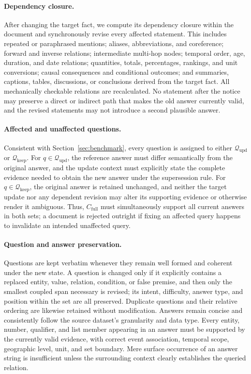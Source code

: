 \paragraph{Dependency closure.}
After changing the target fact, we compute its dependency closure within the document and synchronously revise every affected statement. This includes repeated or paraphrased mentions; aliases, abbreviations, and coreference; forward and inverse relations; intermediate multi-hop nodes; temporal order, age, duration, and date relations; quantities, totals, percentages, rankings, and unit conversions; causal consequences and conditional outcomes; and summaries, captions, tables, discussions, or conclusions derived from the target fact. All mechanically checkable relations are recalculated. No statement after the notice may preserve a direct or indirect path that makes the old answer currently valid, and the revised statements may not introduce a second plausible answer.

\paragraph{Affected and unaffected questions.}
Consistent with Section~\ref{sec:benchmark}, every question is assigned to either $\mathcal{Q}_{\mathrm{upd}}$ or $\mathcal{Q}_{\mathrm{keep}}$. For $q\in\mathcal{Q}_{\mathrm{upd}}$, the reference answer must differ semantically from the original answer, and the update context must explicitly state the complete evidence needed to obtain the new answer under the supersession rule. For $q\in\mathcal{Q}_{\mathrm{keep}}$, the original answer is retained unchanged, and neither the target update nor any dependent revision may alter its supporting evidence or otherwise render it ambiguous. Thus, $C_{\mathrm{full}}$ must simultaneously support all current answers in both sets; a document is rejected outright if fixing an affected query happens to invalidate an intended unaffected query.

\paragraph{Question and answer preservation.}
Questions are kept verbatim whenever they remain well formed and coherent under the new state. A question is changed only if it explicitly contains a replaced entity, value, relation, condition, or false premise, and then only the smallest coupled span necessary is revised; its intent, difficulty, answer type, and position within the set are all preserved. Duplicate questions and their relative ordering are likewise retained without modification. Answers remain concise and consistently follow the source dataset's granularity and data type. Every entity, number, qualifier, and list member appearing in an answer must be supported by the currently valid evidence, with correct event association, temporal scope, geographic level, unit, and set boundary. Mere surface occurrence of an answer string is insufficient unless the surrounding context clearly establishes the queried relation.

